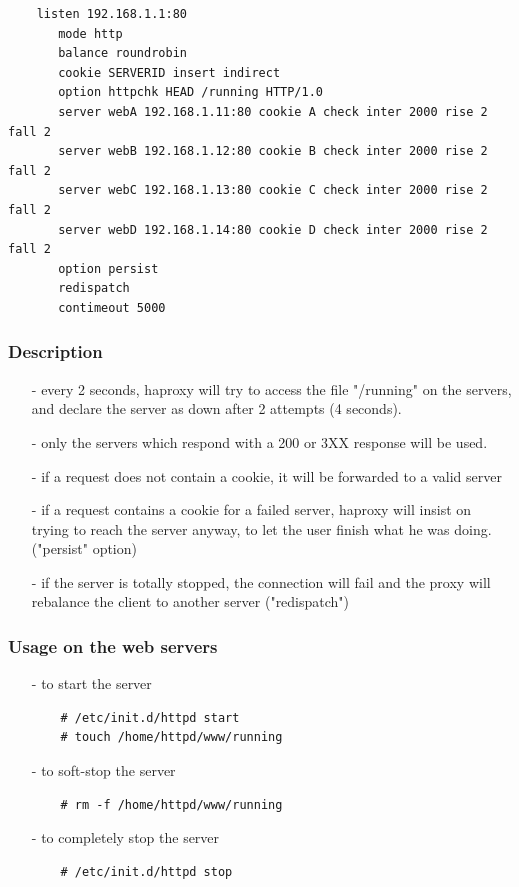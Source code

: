 \begin{verbatim}       
    listen 192.168.1.1:80
       mode http
       balance roundrobin
       cookie SERVERID insert indirect
       option httpchk HEAD /running HTTP/1.0
       server webA 192.168.1.11:80 cookie A check inter 2000 rise 2 fall 2
       server webB 192.168.1.12:80 cookie B check inter 2000 rise 2 fall 2
       server webC 192.168.1.13:80 cookie C check inter 2000 rise 2 fall 2
       server webD 192.168.1.14:80 cookie D check inter 2000 rise 2 fall 2
       option persist
       redispatch
       contimeout 5000
\end{verbatim}

\subsubsection{Description}

\begin{itemize}
\item[-] every 2 seconds, haproxy will try to access the file "/running" on the
   servers, and declare the server as down after 2 attempts (4 seconds).
\item[-] only the servers which respond with a 200 or 3XX response will be used.
\item[-] if a request does not contain a cookie, it will be forwarded to a valid
   server
\item[-] if a request contains a cookie for a failed server, haproxy will insist
   on trying to reach the server anyway, to let the user finish what he was
   doing. ("persist" option)
\item[-] if the server is totally stopped, the connection will fail and the proxy
   will rebalance the client to another server ("redispatch")
\end{itemize}

\subsubsection{Usage on the web servers}

\begin{itemize}
\item[-] to start the server
\begin{verbatim}
    # /etc/init.d/httpd start
    # touch /home/httpd/www/running
\end{verbatim}
\item[-] to soft-stop the server
\begin{verbatim}
    # rm -f /home/httpd/www/running
\end{verbatim}
\item[-] to completely stop the server
\begin{verbatim}
    # /etc/init.d/httpd stop
\end{verbatim}
\end{itemize}

